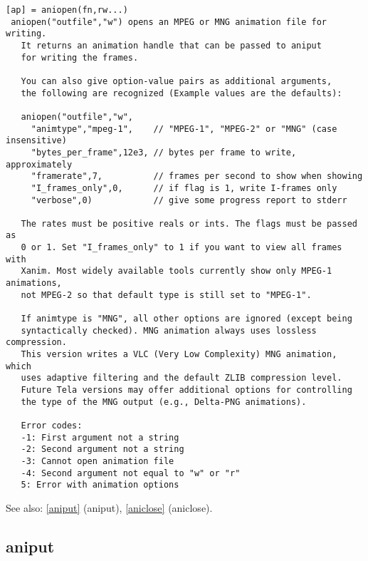 \documentclass[a4paper]{article}
\begin{document}
\begin{tscreen}
\begin{verbatim}
[ap] = aniopen(fn,rw...)
 aniopen("outfile","w") opens an MPEG or MNG animation file for writing.
   It returns an animation handle that can be passed to aniput
   for writing the frames.

   You can also give option-value pairs as additional arguments,
   the following are recognized (Example values are the defaults):

   aniopen("outfile","w",
     "animtype","mpeg-1",    // "MPEG-1", "MPEG-2" or "MNG" (case insensitive)
     "bytes_per_frame",12e3, // bytes per frame to write, approximately
     "framerate",7,          // frames per second to show when showing
     "I_frames_only",0,      // if flag is 1, write I-frames only
     "verbose",0)            // give some progress report to stderr

   The rates must be positive reals or ints. The flags must be passed as
   0 or 1. Set "I_frames_only" to 1 if you want to view all frames with
   Xanim. Most widely available tools currently show only MPEG-1 animations,
   not MPEG-2 so that default type is still set to "MPEG-1".

   If animtype is "MNG", all other options are ignored (except being
   syntactically checked). MNG animation always uses lossless compression.
   This version writes a VLC (Very Low Complexity) MNG animation, which
   uses adaptive filtering and the default ZLIB compression level.
   Future Tela versions may offer additional options for controlling
   the type of the MNG output (e.g., Delta-PNG animations).

   Error codes:
   -1: First argument not a string
   -2: Second argument not a string
   -3: Cannot open animation file
   -4: Second argument not equal to "w" or "r"
   5: Error with animation options
\end{verbatim}

See also: \ref{aniput} {(aniput)}, \ref{aniclose} {(aniclose)}.
\end{tscreen}





\subsection{aniput\label{aniput}}
\end{document}
